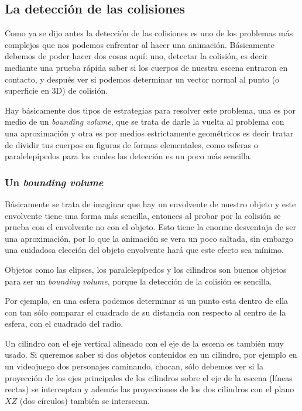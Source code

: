 \subsection{La detección de las colisiones}
Como ya se dijo antes la detección de las colisiones es uno de los problemas más complejos que nos podemos enfrentar al hacer una animación. Básicamente debemos de poder hacer dos cosas aquí: uno, detectar la colisión, es decir mediante una prueba rápida saber si los cuerpos de nuestra escena entraron en contacto, y después ver si podemos determinar un vector normal al punto (o superficie en 3D) de colisión.

Hay básicamente dos tipos de estrategias para resolver este problema, una es por medio de un \foreignlanguage{english}{\emph{bounding volume}}, que se trata de darle la vuelta al problema con una aproximación y otra es por medios estrictamente geométricos es decir tratar de dividir tus cuerpos en figuras de formas elementales, como esferas o paralelepípedos para los cuales las detección es un poco más sencilla.

\subsubsection{Un \foreignlanguage{english}{\emph{bounding volume}}}
Básicamente se trata de imaginar que hay un envolvente de nuestro objeto y este envolvente tiene una forma más sencilla, entonces al probar por la colisión se prueba con el envolvente no con el objeto. Esto tiene la enorme desventaja de ser una aproximación, por lo que la animación se vera un poco saltada, sin embargo una cuidadosa elección del objeto envolvente hará que este efecto sea mínimo.

Objetos como las elipses, los paralelepípedos y los cilindros son buenos objetos para ser un \foreignlanguage{english}{\emph{bounding volume}}, porque la detección de la colisión es sencilla.

Por ejemplo, en una esfera podemos determinar si un punto esta dentro de ella con tan sólo comparar el cuadrado de su distancia con respecto al centro de la esfera, con el cuadrado del radio. 

Un cilindro con el eje vertical alineado con el eje de la escena es también muy usado. Si queremos saber si dos objetos contenidos en un cilindro, por ejemplo en un videojuego dos personajes caminando, chocan, sólo debemos ver si la proyección de los ejes principales de los cilindros sobre el eje de la escena (líneas rectas) se interceptan y además las proyecciones de los dos cilindros con el plano $XZ$ (dos círculos) también se intersecan.


